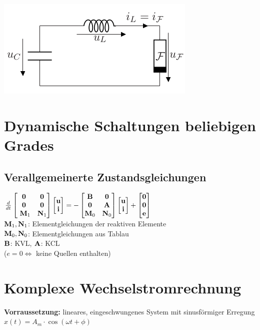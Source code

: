 \documentclass[fs, footer]{latex4ei}
\begin{document}
\begin{multicols*}{4}
\includegraphics[width=.5\linewidth]{img/relaxationsoszillator-schaltung} 
\section{Dynamische Schaltungen beliebigen Grades}
\subsection{Verallgemeinerte Zustandsgleichungen}
$\frac{d}{dt} \begin{bmatrix} \textbf{0} & \textbf{0}\\\textbf{0} & \textbf{0}\\\ \textbf{M}_1 & \textbf{N}_1 \end{bmatrix}\begin{bmatrix} \textbf{u}\\\textbf{i} \end{bmatrix} = - \begin{bmatrix}  \textbf{B} & \textbf{0} \\ \textbf{0} & \textbf{A} \\ \textbf{M}_0 & \textbf{N}_0 \end{bmatrix}\begin{bmatrix} \textbf{u}\\\textbf{i} \end{bmatrix} + \begin{bmatrix} \textbf{0}\\\textbf{0}\\\textbf{e} \end{bmatrix}$\\
	$\textbf{M}_1, \textbf{N}_1$: Elementgleichungen der reaktiven Elemente\\
	$\textbf{M}_0, \textbf{N}_0$: Elementgleichungen aus Tablau\\
	$\textbf{B}$: KVL, $\textbf{A}$: KCL\\
	($e = 0 \Leftrightarrow$ keine Quellen enthalten)
\section{Komplexe Wechselstromrechnung}
\textbf{Vorraussetzung:} lineares, eingeschwungenes System mit sinusförmiger Erregung $x(t) = A_m \cdot \cos(\omega t + \phi)$\\
\end{multicols*}
\end{document}

